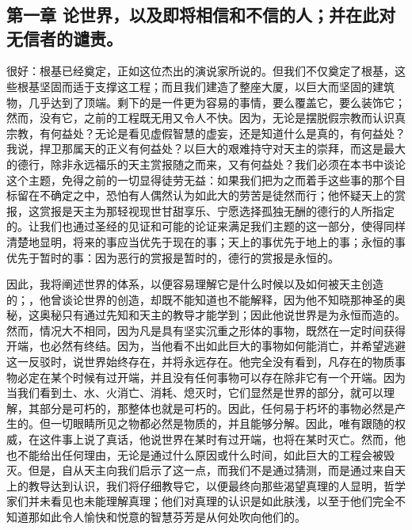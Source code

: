 
\section{}


\subsection{第一章 论世界，以及即将相信和不信的人；并在此对无信者的谴责。}

很好：根基已经奠定，正如这位杰出的演说家所说的。但我们不仅奠定了根基，这些根基坚固而适于支撑这工程；而且我们建造了整座大厦，以巨大而坚固的建筑物，几乎达到了顶端。剩下的是一件更为容易的事情，要么覆盖它，要么装饰它；然而，没有它，之前的工程既无用又令人不快。因为，无论是摆脱假宗教而认识真宗教，有何益处？无论是看见虚假智慧的虚妄，还是知道什么是真的，有何益处？我说，捍卫那属天的正义有何益处？以巨大的艰难持守对天主的崇拜，而这是最大的德行，除非永远福乐的天主赏报随之而来，又有何益处？我们必须在本书中谈论这个主题，免得之前的一切显得徒劳无益：如果我们把为之而着手这些事的那个目标留在不确定之中，恐怕有人偶然认为如此大的劳苦是徒然而行；他怀疑天上的赏报，这赏报是天主为那轻视现世甘甜享乐、宁愿选择孤独无酬的德行的人所指定的。让我们也通过圣经的见证和可能的论证来满足我们主题的这一部分，使得同样清楚地显明，将来的事应当优先于现在的事；天上的事优先于地上的事；永恒的事优先于暂时的事：因为恶行的赏报是暂时的，德行的赏报是永恒的。\par

因此，我将阐述世界的体系，以便容易理解它是什么时候以及如何被天主创造的；，他曾谈论世界的创造，却既不能知道也不能解释，因为他不知晓那神圣的奥秘，这奥秘只有通过先知和天主的教导才能学到；因此他说世界是为永恒而造的。然而，情况大不相同，因为凡是具有坚实沉重之形体的事物，既然在一定时间获得开端，也必然有终结。因为，当他看不出如此巨大的事物如何能消亡，并希望逃避这一反驳时，说世界始终存在，并将永远存在。他完全没有看到，凡存在的物质事物必定在某个时候有过开端，并且没有任何事物可以存在除非它有一个开端。因为当我们看到土、水、火消亡、消耗、熄灭时，它们显然是世界的部分，就可以理解，其部分是可朽的，那整体也就是可朽的。因此，任何易于朽坏的事物必然是产生的。但一切眼睛所见之物都必然是物质的，并且能够分解。因此，唯有跟随的权威，在这件事上说了真话，他说世界在某时有过开端，也将在某时灭亡。然而，他也不能给出任何理由，无论是通过什么原因或什么时间，如此巨大的工程会被毁灭。但是，自从天主向我们启示了这一点，而我们不是通过猜测，而是通过来自天上的教导达到认识，我们将仔细教导它，以便最终向那些渴望真理的人显明，哲学家们并未看见也未能理解真理；他们对真理的认识是如此肤浅，以至于他们完全不知道那如此令人愉快和悦意的智慧芬芳是从何处吹向他们的。\par

